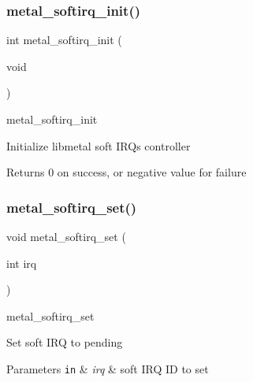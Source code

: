 \subsubsection{\texorpdfstring{metal\+\_\+softirq\+\_\+init()}{metal\_softirq\_init()}}
{\footnotesize\ttfamily int metal\+\_\+softirq\+\_\+init (\begin{DoxyParamCaption}\item[{void}]{ }\end{DoxyParamCaption})}



metal\+\_\+softirq\+\_\+init 

Initialize libmetal soft I\+R\+Qs controller

\begin{DoxyReturn}{Returns}
0 on success, or negative value for failure 
\end{DoxyReturn}
\mbox{\label{group__soft_gad825e34f93638fe47be10da3f19dacf8}} 
\subsubsection{\texorpdfstring{metal\+\_\+softirq\+\_\+set()}{metal\_softirq\_set()}}
{\footnotesize\ttfamily void metal\+\_\+softirq\+\_\+set (\begin{DoxyParamCaption}\item[{int}]{irq }\end{DoxyParamCaption})}



metal\+\_\+softirq\+\_\+set 

Set soft I\+RQ to pending


\begin{DoxyParams}[1]{Parameters}
\mbox{\tt in}  & {\em irq} & soft I\+RQ ID to set \\
\hline
\end{DoxyParams}
